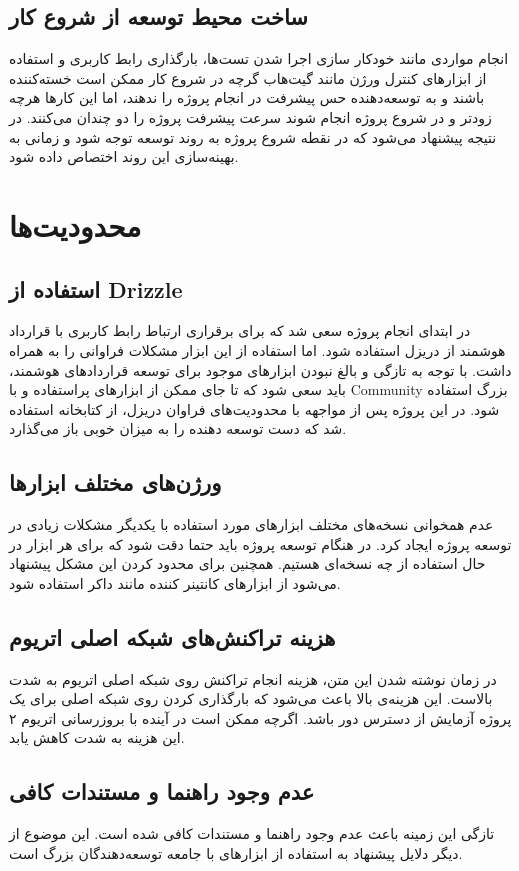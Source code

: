 \subsection{ساخت محیط توسعه از شروع کار}
انجام مواردی مانند خودکار سازی اجرا شدن تست‌ها،
بارگذاری رابط کاربری و استفاده از ابزارهای کنترل ورژن مانند گیت‌هاب
گرچه در شروع کار ممکن است خسته‌کننده باشند و به توسعه‌دهنده حس پیشرفت در انجام پروژه را ندهند، اما
این کارها هرچه زودتر و در شروع پروژه انجام شوند سرعت پیشرفت پروژه را دو چندان می‌کنند.
در نتیجه پیشنهاد می‌شود که در نقطه شروع پروژه به روند توسعه توجه شود و زمانی به
بهینه‌سازی این روند اختصاص داده شود.


\section{محدودیت‌ها}

\subsection{استفاده از
\gls{Drizzle}
}
در ابتدای انجام پروژه سعی شد که برای برقراری ارتباط رابط کاربری با قرارداد هوشمند از دریزل استفاده شود.
اما استفاده از این ابزار مشکلات فراوانی را به همراه داشت.
با توجه به تازگی و بالغ نبودن ابزارهای موجود برای توسعه قراردادهای هوشمند،
باید سعی شود که تا جای ممکن از ابزارهای پراستفاده و با
\gls{Community}
بزرگ استفاده شود. در این پروژه پس از مواجهه با محدودیت‌های فراوان دریزل،
از کتابخانه‌  استفاده شد که دست توسعه دهنده را به میزان خوبی باز می‌گذارد.

\subsection{ورژن‌های مختلف ابزارها}
عدم همخوانی نسخه‌های مختلف ابزارهای مورد استفاده با یکدیگر مشکلات زیادی در توسعه پروژه ایجاد کرد.
در هنگام توسعه پروژه باید حتما دقت شود که برای هر ابزار در حال استفاده از چه نسخه‌ای هستیم.
همچنین برای محدود کردن این مشکل پیشنهاد می‌شود از ابزارهای کانتینر کننده مانند داکر استفاده شود.

\subsection{هزینه تراکنش‌های شبکه اصلی اتریوم}
در زمان نوشته شدن این متن، هزینه انجام تراکنش روی شبکه اصلی اتریوم به شدت بالاست.
این هزینه‌ی بالا باعث می‌شود که بارگذاری کردن روی شبکه اصلی برای یک پروژه آزمایش از دسترس دور باشد.
اگرچه ممکن است در آینده با بروزرسانی اتریوم ۲ این هزینه به شدت کاهش یابد.

\subsection{عدم وجود راهنما و مستندات کافی}
تازگی این زمینه باعث عدم وجود راهنما و مستندات کافی شده است.
این موضوع از دیگر دلایل پیشنهاد به استفاده از ابزارهای با جامعه توسعه‌دهندگان بزرگ است.
